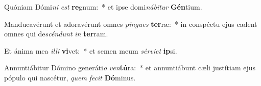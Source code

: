 \item Quóniam Dómi\textit{ni} \textit{est} \textbf{re}gnum:~* et ipse domi\textit{ná}\textit{bi}\textit{tur} \textbf{Gén}tium.
\item Manducavérunt et adoravérunt omnes \textit{pin}\textit{gues} \textbf{ter}ræ:~* in conspéctu ejus cadent omnes qui de\textit{scén}\textit{dunt} \textit{in} \textbf{ter}ram.
\item Et ánima mea \textit{il}\textit{li} \textbf{vi}vet:~* et semen meum \textit{sér}\textit{vi}\textit{et} \textbf{ip}si.
\item Annuntiábitur Dómino generáti\textit{o} \textit{ven}\textbf{tú}ra:~* et annuntiábunt cæli justítiam ejus pópulo qui nascétur, \textit{quem} \textit{fe}\textit{cit} \textbf{Dó}minus.
